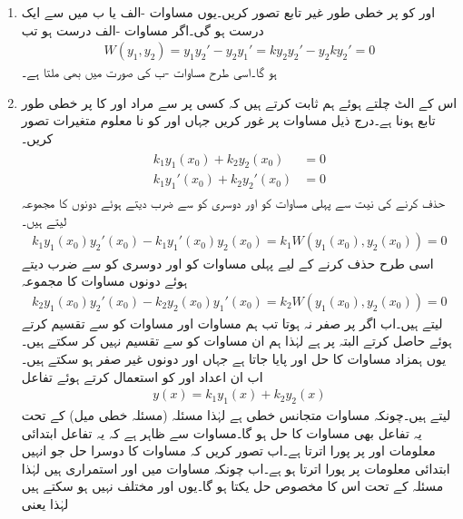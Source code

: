 \begin{enumerate}
\item[(الف)]
 اور  کو  پر خطی طور غیر تابع تصور کریں۔یوں مساوات -الف یا ب میں سے ایک درست ہو گی۔اگر  مساوات -الف  درست ہو تب
\begin{align*}
W(y_1,y_2)=y_1y_2'-y_2y_1'=ky_2y_2'-y_2ky_2'=0
\end{align*}
ہو گا۔اسی طرح مساوات -ب کی صورت میں بھی  ملتا ہے۔
\item[(ب)]
 اس کے الٹ چلتے ہوئے ہم ثابت کرتے ہیں کہ کسی  پر  سے مراد  اور  کا  پر خطی طور تابع ہونا ہے۔درج ذیل مساوات پر غور کریں جہاں  اور  کو نا معلوم متغیرات تصور کریں۔
\begin{gather}
\begin{aligned}\label{مساوات_سادہ_دو_درجی_ثبوت_الف}
k_1y_1(x_0)+k_2y_2(x_0)&=0\\
k_1y_1'(x_0)+k_2y_2'(x_0)&=0
\end{aligned}
\end{gather}
 حذف کرنے کی نیت سے  پہلی مساوات کو  اور دوسری کو  سے ضرب دیتے ہوئے دونوں کا مجموعہ لیتے ہیں۔
\begin{align}\label{مساوات_سادہ_دو_درجی_ثبوت_ب}
k_1y_1(x_0)y_2'(x_0)-k_1y_1'(x_0)y_2(x_0)=k_1W(y_1(x_0),y_2(x_0))=0
\end{align}
اسی طرح  حذف کرنے کے لیے پہلی مساوات کو  اور دوسری کو  سے ضرب دیتے ہوئے دونوں مساوات کا مجموعہ
\begin{align}\label{مساوات_سادہ_دو_درجی_ثبوت_پ}
k_2y_1(x_0)y_2'(x_0)-k_2y_2(x_0)y_1'(x_0)=k_2W(y_1(x_0),y_2(x_0))=0
\end{align}
لیتے ہیں۔اب اگر  پر  صفر نہ ہوتا تب ہم مساوات  اور مساوات  کو  سے تقسیم کرتے ہوئے  حاصل کرتے البتہ  پر  ہے لہٰذا ہم ان مساوات کو  سے  تقسیم نہیں کر سکتے ہیں۔ یوں  ہمزاد مساوات  کا حل  اور  پایا جاتا ہے جہاں  اور  دونوں غیر صفر ہو سکتے ہیں۔ اب ان اعداد  اور  کو استعمال کرتے ہوئے تفاعل
\begin{align}
y(x)=k_1y_1(x)+k_2y_2(x)
\end{align}
لیتے ہیں۔چونکہ مساوات  متجانس خطی ہے لہٰذا  مسئلہ   (مسئلہ خطی میل) کے تحت  یہ تفاعل بھی مساوات  کا حل ہو گا۔مساوات  سے ظاہر ہے کہ یہ تفاعل ابتدائی معلومات  اور  پر پورا اترتا ہے۔اب تصور کریں کہ مساوات  کا دوسرا حل جو انہیں  ابتدائی معلومات پر پورا اترتا ہو  ہے۔اب چونکہ مساوات  میں  اور  استمراری ہیں لہٰذا مسئلہ  کے تحت اس کا مخصوص حل یکتا ہو گا۔یوں  اور  مختلف نہیں ہو سکتے ہیں لہٰذا  یعنی

\end{enumerate}
